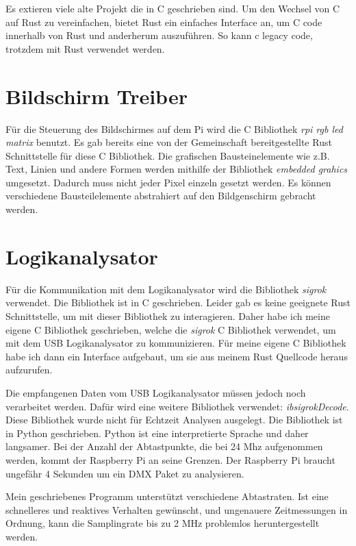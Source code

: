 Es extieren viele alte Projekt die in C geschrieben sind. Um den Wechsel von C auf Rust zu vereinfachen, bietet Rust ein einfaches Interface an, um C code innerhalb von Rust und anderherum auszuführen. So kann c legacy code, trotzdem mit Rust verwendet werden.

\section{Bildschirm Treiber}

Für die Steuerung des Bildschirmes auf dem Pi wird die C Bibliothek \emph{rpi rgb led matrix} \cite{githubRpi-rgb-led-matrix} benutzt. Es gab bereits eine von der Gemeinschaft bereitgestellte Rust Schnittstelle für diese C Bibliothek. Die grafischen Bausteinelemente wie z.B. Text, Linien und andere Formen werden mithilfe der Bibliothek \emph{embedded grahics}
\cite{githubEmbedded-graphics}
umgesetzt. Dadurch muss nicht jeder Pixel einzeln gesetzt werden. Es können verschiedene Bausteilelemente abstrahiert auf den Bildgenschirm gebracht werden. 



\section{Logikanalysator}
Für die Kommunikation mit dem Logikanalysator wird die Bibliothek \emph{sigrok} \cite{githubLibsigrok} verwendet. Die Bibliothek ist in C geschrieben. Leider gab es keine geeignete Rust Schnittstelle, um mit dieser Bibliothek zu interagieren. Daher habe ich meine eigene C Bibliothek geschrieben, welche die \emph{sigrok} C Bibliothek verwendet, um mit dem USB Logikanalysator zu kommunizieren. Für meine eigene C Bibliothek habe ich dann ein Interface aufgebaut, um sie aus meinem Rust Quellcode heraus aufzurufen.

Die empfangenen Daten vom USB Logikanalysator müssen jedoch noch verarbeitet werden. Dafür wird eine weitere Bibliothek verwendet: \emph{ibsigrokDecode}\cite{githubLibsigrokDecode}.
Diese Bibliothek wurde nicht für Echtzeit Analysen ausgelegt. Die Bibliothek ist in Python geschrieben. Python ist eine interpretierte Sprache und daher langsamer. Bei der Anzahl der Abtastpunkte, die bei 24 Mhz aufgenommen werden, kommt der Raspberry Pi an seine Grenzen. Der Raspberry Pi braucht ungefähr 4 Sekunden um ein DMX Paket zu analysieren.

Mein geschriebenes Programm unterstützt verschiedene Abtastraten. Ist eine schnelleres und reaktives Verhalten gewünscht, und ungenauere Zeitmessungen in Ordnung, kann die Samplingrate bis zu 2 MHz problemlos heruntergestellt werden.

